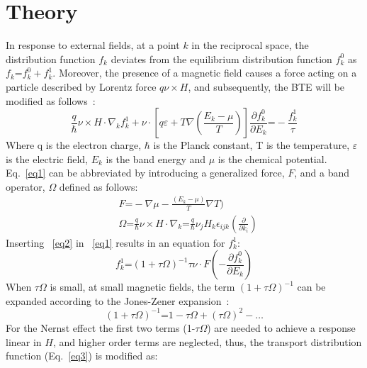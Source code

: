 \section{Theory}
\label{nerwann-theory}
In response to external fields, at a point $k$ in the reciprocal space, the distribution function $f_{k}$ deviates from the equilibrium distribution function $f_{k}^{0}$ as $f_{k}\textbf{=}f_{k}^{0}+f_{k}^{1}$. Moreover, the presence of a magnetic field causes a force acting on a particle described by Lorentz force $q\nu\times H$, and subsequently, the BTE will be modified as follows~\cite{smith1967electronic}: 
\begin{equation}
\frac{q}{\hbar}\nu\times H\cdot \nabla _{k} f_{k}^{1}+\nu \cdot [q\varepsilon + T\nabla (\frac{E_{k}-\mu}{T})]\frac{\partial f_{k}^{0}}{\partial E_{k}}\textbf{=}- \frac{f_{k}^{1}}{\tau}
\label{eq1}   
\end{equation}
Where q is the electron charge, $\hbar$ is the Planck constant, T is the temperature, $\varepsilon$ is the electric field, $E_{k}$ is the band energy and $\mu$ is the chemical potential. Eq.~\ref{eq1} can be abbreviated by introducing a generalized force, $F$, and a band operator, $\Omega$ defined as follows:
\begin{equation}
\begin{split}
&F\textbf{=}-\nabla \mu -\frac{(E_{k}-\mu)}{T}\nabla T) \\
&\Omega\textbf{=}\frac{q}{\hbar}\nu\times H\cdot\nabla _{k}\textbf{=}\frac{q}{\hbar}\nu _{j}H_{k}\epsilon _{ijk}(\frac{\partial}{\partial k_{i}}) 
\end{split}
\label{eq2}
\end{equation}
Inserting ~\ref{eq2} in ~\ref{eq1} results in an equation for $f_{k}^{1}$:
\begin{equation}
f_{k}^{1}\textbf{=}(1+\tau \Omega)^{-1}\tau \nu \cdot F(-\frac{\partial f_{k}^{0}}{\partial E_{k}})
\label{eq3}
\end{equation}
When  $\tau \Omega$ is small, at small magnetic fields, the term $(1+\tau \Omega)^{-1}$ can be expanded according to the Jones-Zener expansion~\cite{jones-zener}:
\begin{equation}
(1+\tau \Omega)^{-1}\textbf{=}1-\tau \Omega +(\tau \Omega)^{2}-\dots
\label{eq4}
\end{equation}
For the Nernst effect the first two terms (1-$\tau \Omega$) are needed to achieve a response linear in $H$, and higher order terms are neglected, thus, the transport distribution function (Eq.~\ref{eq3}) is modified as:
